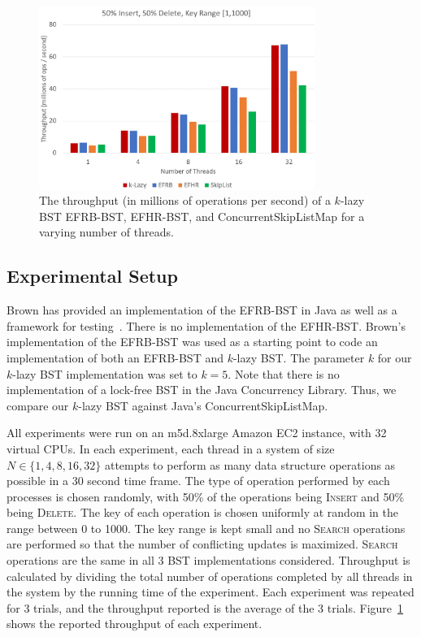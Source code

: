 \documentclass[letterpaper,twocolumn]{article}
\begin{document}
\begin{figure}[!tb]
	\centering
	\includegraphics[width=0.80\textwidth]{results.png} 
	\caption{The throughput (in millions of operations per second) of a $k$-lazy BST EFRB-BST, EFHR-BST, and ConcurrentSkipListMap for a varying number of threads.}
	\label{results}
\end{figure}


\subsection{Experimental Setup}
Brown has provided an implementation of the EFRB-BST in Java as well as a framework for testing~\cite{BrownImpl19}. There is no implementation of the EFHR-BST. Brown's implementation of the EFRB-BST was used as a starting point to code an implementation of both an EFRB-BST and $k$-lazy BST. The parameter $k$ for our $k$-lazy BST implementation was set to $k = 5$. Note that there is no implementation of a lock-free BST in the Java Concurrency Library. Thus, we compare our $k$-lazy BST against Java's ConcurrentSkipListMap.

All experiments were run on an m5d.8xlarge Amazon EC2 instance, with 32 virtual CPUs. In each experiment, each thread in a system of size $N \in  \{1, 4, 8, 16, 32\}$ attempts to perform as many data structure operations as possible in a 30 second time frame. The type of operation performed by each processes is chosen randomly, with 50\% of the operations being \textsc{Insert} and 50\% being \textsc{Delete}. The key of each operation is chosen uniformly at random in the range between 0 to 1000. The key range is kept small and no \textsc{Search} operations are performed so that the number of conflicting updates is maximized. \textsc{Search} operations are the same in all 3 BST implementations considered. Throughput is calculated by dividing the total number of operations completed by all threads in the system by the running time of the experiment. Each experiment was repeated for 3 trials, and the throughput reported is the average of the 3 trials. Figure~\ref{results} shows the reported throughput of each experiment.
\end{document}
